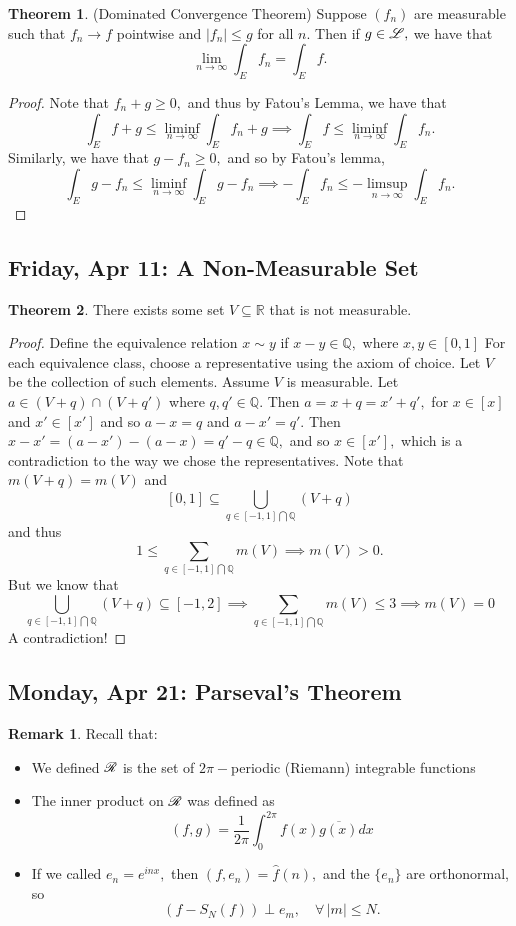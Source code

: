 \documentclass[10pt, oneside]{article}
\newcommand{\bbR}{\mathbb{R}}
\newcommand{\bbQ}{\mathbb{Q}}
\theoremstyle{definition}
\newtheorem{thm}{Theorem}
\newtheorem{rem}{Remark}
\begin{document}
 \begin{thm}
     (Dominated Convergence Theorem) Suppose $(f_n)$ are measurable such that $f_n \to f$ pointwise and $|f_n| \leq g$ for all $n.$ Then if $g \in \cal L,$ we have that 
     \[\lim_{n\to \infty }\int_E f_n = \int_E f.\]
 \end{thm}
 \begin{proof}
     Note that $f_n + g \geq 0,$ and thus by Fatou's Lemma, we have that 
     \[\int_E f + g \leq \liminf_{n\to \infty}\int_E f_n + g \implies \int_E f \leq \liminf_{n\to \infty} \int_E f_n.\] Similarly, we have that $g - f_n \geq 0,$ and so by Fatou's lemma, 
     \[\int_E g - f_n \leq \liminf_{n\to \infty} \int_E g - f_n \implies -\int_Ef_n \leq -\limsup_{n\to \infty} \int_E f_n.\]
 \end{proof}

\newpage
\subsection{Friday, Apr 11: A Non-Measurable Set}
\begin{thm}
    There exists some set $V \subseteq \bbR$ that is not measurable.
\end{thm}
\begin{proof}
Define the equivalence relation $x\sim y$ if $x - y \in \bbQ,$ where $x,y \in [0,1]$ For each equivalence class, choose a representative using the axiom of choice. Let $V$ be the collection of such elements. Assume $V$ is measurable. Let $a\in (V + q) \cap (V + q')$ where $q, q' \in \bbQ.$ Then $a = x + q = x' + q',$ for $x \in [x]$ and $x' \in [x']$ and so $a - x = q$ and $a - x' = q'.$ Then $x - x' = (a-x') - (a-x) = q' -q \in \bbQ,$ and so $x \in [x'],$ which is a contradiction to the way we chose the representatives. Note that $m(V + q) = m(V)$ and 
\[[0,1] \subseteq \bigcup_{q\in [-1,1]\bigcap \bbQ} (V + q)\] and thus 
\[1 \leq \sum_{q\in [-1,1]\bigcap \bbQ} m(V) \implies m(V) >0.\] But we know that 
\[\bigcup_{q\in [-1,1]\bigcap \bbQ} (V + q)\subseteq [-1,2] \implies \sum_{q\in [-1,1]\bigcap \bbQ} m(V) \leq 3 \implies m(V) = 0\]
A contradiction!
    
\end{proof}



\newpage
\subsection{Monday, Apr 21: Parseval's Theorem}
\begin{rem}
    Recall that:
\begin{itemize}
    \item We defined $\cal R$ is the set of $2\pi-$periodic (Riemann) integrable functions
    \item The inner product on $\cal R$ was defined as 
    \[(f,g)= \frac{1}{2\pi}\int_0^{2\pi} f(x)\overline{g(x)}dx\]
    \item If we called $e_n = e^{inx},$ then $(f,e_n) = \hat{f}(n),$ and the $\{e_n\}$ are orthonormal, so 
    \[(f - S_N(f)) \perp e_m, \quad \forall\, |m| \leq N.\]
\end{itemize}
\end{rem}
\end{document}
